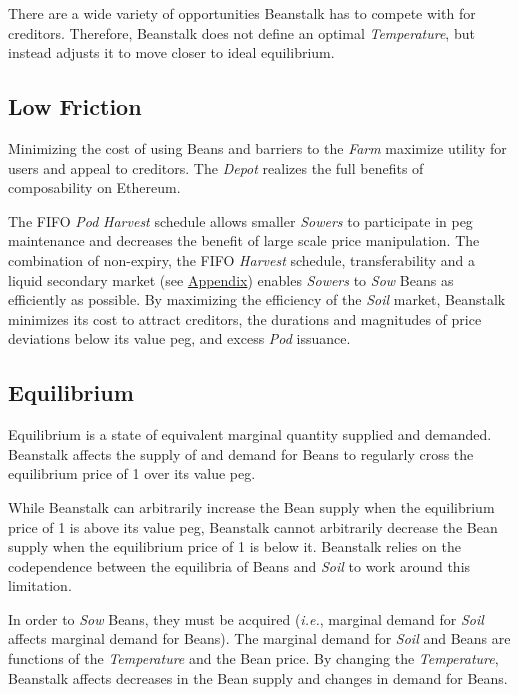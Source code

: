 \documentclass[tikz]{article}
\newcommand{\term}[1]{\textsl{#1}}
\newcommand{\Bean}{} %
\begin{document}
There are a wide variety of opportunities Beanstalk has to compete with for creditors. Therefore, Beanstalk does not define an optimal \term{Temperature}, but instead adjusts it to move closer to ideal equilibrium. 

\vspace*{-1.3mm}
\subsection{Low Friction}
\vspace*{-1.3mm}

Minimizing the cost of using Beans and barriers to the \term{Farm} maximize utility for users and appeal to creditors. The \term{Depot} realizes the full benefits of composability on Ethereum.

The FIFO \term{Pod} \term{Harvest} schedule allows smaller \term{Sowers} to participate in peg maintenance and decreases the benefit of large scale price manipulation. The combination of non-expiry, the FIFO \term{Harvest} schedule, transferability and a liquid secondary market (see \hyperlink{subsection.14.5}{Appendix}) enables \term{Sowers} to \term{Sow} Beans as efficiently as possible. By maximizing the efficiency of the \term{Soil} market, Beanstalk minimizes its cost to attract creditors, the durations and magnitudes of price deviations below its value peg, and excess \term{Pod} issuance.

\vspace*{-1.3mm}
\subsection{Equilibrium}
\vspace*{-1.3mm}

Equilibrium is a state of equivalent marginal quantity supplied and demanded. Beanstalk affects the supply of and demand for Beans to regularly cross the equilibrium price of \Bean1 over its value peg. 

While Beanstalk can arbitrarily increase the Bean supply when the equilibrium price of \Bean1 is above its value peg, Beanstalk cannot arbitrarily decrease the Bean supply when the equilibrium price of \Bean1 is below it. Beanstalk relies on the codependence between the equilibria of Beans and \term{Soil} to work around this limitation. 

In order to \term{Sow} Beans, they must be acquired (\term{i.e.}, marginal demand for \term{Soil} affects marginal demand for Beans). The marginal demand for \term{Soil} and Beans are functions of the \term{Temperature} and the Bean price. By changing the \term{Temperature}, Beanstalk affects decreases in the Bean supply and changes in demand for Beans. 
\end{document}
